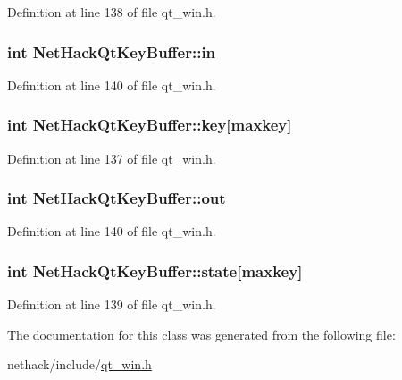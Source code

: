 Definition at line 138 of file qt\+\_\+win.\+h.

\hypertarget{classNetHackQtKeyBuffer_adeb9351d93b6f64ed6e70f9b382cd417}{
\subsubsection[{in}]{\setlength{\rightskip}{0pt plus 5cm}int Net\+Hack\+Qt\+Key\+Buffer\+::in\hspace{0.3cm}{\ttfamily [private]}}}\label{classNetHackQtKeyBuffer_adeb9351d93b6f64ed6e70f9b382cd417}


Definition at line 140 of file qt\+\_\+win.\+h.

\hypertarget{classNetHackQtKeyBuffer_a15eb3119d9d8df0f72185ede2277511e}{
\subsubsection[{key}]{\setlength{\rightskip}{0pt plus 5cm}int Net\+Hack\+Qt\+Key\+Buffer\+::key\mbox{[}{\bf maxkey}\mbox{]}\hspace{0.3cm}{\ttfamily [private]}}}\label{classNetHackQtKeyBuffer_a15eb3119d9d8df0f72185ede2277511e}


Definition at line 137 of file qt\+\_\+win.\+h.

\hypertarget{classNetHackQtKeyBuffer_a08e72debab7ef41fd34fc945fd980e0c}{
\subsubsection[{out}]{\setlength{\rightskip}{0pt plus 5cm}int Net\+Hack\+Qt\+Key\+Buffer\+::out\hspace{0.3cm}{\ttfamily [private]}}}\label{classNetHackQtKeyBuffer_a08e72debab7ef41fd34fc945fd980e0c}


Definition at line 140 of file qt\+\_\+win.\+h.

\hypertarget{classNetHackQtKeyBuffer_a1e36092386de6ea377dac2fd8a08beba}{
\subsubsection[{state}]{\setlength{\rightskip}{0pt plus 5cm}int Net\+Hack\+Qt\+Key\+Buffer\+::state\mbox{[}{\bf maxkey}\mbox{]}\hspace{0.3cm}{\ttfamily [private]}}}\label{classNetHackQtKeyBuffer_a1e36092386de6ea377dac2fd8a08beba}


Definition at line 139 of file qt\+\_\+win.\+h.



The documentation for this class was generated from the following file\+:\begin{DoxyCompactItemize}
\item 
nethack/include/\hyperlink{qt__win_8h}{qt\+\_\+win.\+h}\end{DoxyCompactItemize}

